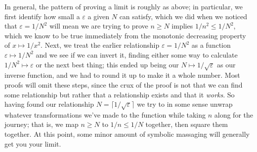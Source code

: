 \documentclass[11pt]{article}
\begin{document}
In general, the pattern of proving a limit is roughly as above; in particular, we first identify how small a $\varepsilon$ a given $N$ can satisfy, which we did when we noticed that $\varepsilon = 1/N^2$ will mean we are trying to prove $n \ge N$ implies $1/n^2 \le 1/N^2$, which we know to be true immediately from the monotonic decreasing property of $x \mapsto 1/x^2$. Next, we treat the earlier relationship $\varepsilon = 1/N^2$ as a function $\varepsilon \mapsto 1/N^2$ and we see if we can invert it, finding either some way to calculate $1/N^2 \mapsto \varepsilon$ or the next best thing; this ended up being our $N \mapsto 1/\sqrt{\varepsilon}$ as our inverse function, and we had to round it up to make it a whole number. Most proofs will omit these steps, since the crux of the proof is not that we can find some relationship but rather that a relationship exists and that it \emph{works}. So having found our relationship $N = \lceil 1/\sqrt{\varepsilon} \rceil$ we try to in some sense unwrap whatever transformations we've made to the function while taking $n$ along for the journey; that is, we map $n \ge N$ to $1/n \le 1/N$ together, then square them together. At this point, some minor amount of symbolic massaging will generally get you your limit.
\end{document}
